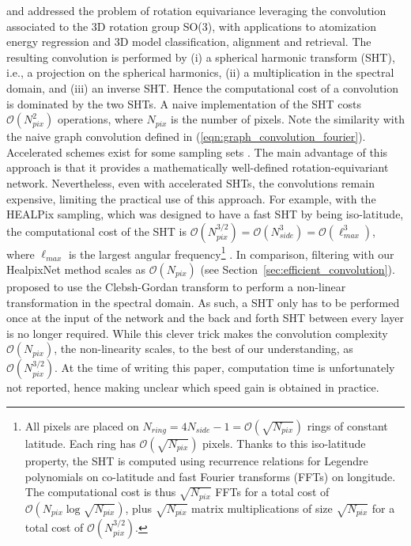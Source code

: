 \documentclass[final,twocolumn,3p,times,authoryear]{elsarticle}
\newcommand{\secref}[1]{Section~\ref{sec:#1}}
\newcommand{\eqnref}[1]{(\ref{eqn:#1})}
\newcommand{\1}{\b{1}}              %
\newcommand{\0}{\b{0}}              %
\newcommand{\bO}{\mathcal{O}}
\begin{document}

\citet{cohen2018sphericalcnn} and \citet{esteves2017sphericalcnn} addressed the problem of rotation equivariance leveraging the convolution associated to the 3D rotation group SO(3), with applications to atomization energy regression and 3D model classification, alignment and retrieval.
The resulting convolution is performed by (i) a spherical harmonic transform (SHT), i.e., a projection on the spherical harmonics, (ii) a  multiplication in the spectral domain, and (iii) an inverse SHT. Hence the computational cost of a convolution is dominated by the two SHTs.
A naive implementation of the SHT costs $\bO(N_{pix}^2)$ operations, where $N_{pix}$ is the number of pixels. Note the similarity with the naive graph convolution defined in \eqnref{graph_convolution_fourier}.
Accelerated schemes exist for some sampling sets \citep[see][for examples]{mohlenkamp1999fast, rokhlin2006fast, reinecke2013libsharp}.
The main advantage of this approach is that it provides a mathematically well-defined rotation-equivariant network. Nevertheless, even with accelerated SHTs, the convolutions remain expensive, limiting the practical use of this approach.
For example, with the HEALPix sampling, which was designed to have a fast SHT by being iso-latitude, the computational cost of the SHT is $\bO(N_{pix}^{3/2}) = \bO(N_{side}^3) = \bO(\ell_{max}^3)$, where $\ell_{max}$ is the largest angular frequency\footnote{All pixels are placed on $N_{ring} = 4N_{side}-1 = \bO\left(\sqrt{N_{pix}}\right)$ rings of constant latitude. Each ring has $\bO\left(\sqrt{N_{pix}}\right)$ pixels. Thanks to this iso-latitude property, the SHT is computed using recurrence relations for Legendre polynomials on co-latitude and fast Fourier transforms (FFTs) on longitude. The computational cost is thus $\sqrt{N_{pix}}$ FFTs for a total cost of $\bO\left( N_{pix} \log \sqrt{N_{pix}} \right)$, plus $\sqrt{N_{pix}}$ matrix multiplications of size $\sqrt{N_{pix}}$ for a total cost of $\bO\left(N_{pix}^{3/2}\right)$.}
\citep{gorski2005healpix, reinecke2013libsharp}.
In comparison, filtering with our HealpixNet method scales as $\bO(N_{pix})$ (see \secref{efficient_convolution}).
\citet{kondor2018clebsch} proposed to use the Clebsh-Gordan transform to perform a non-linear transformation in the spectral domain. As such, a SHT only has to be performed once at the input of the network and the back and forth SHT between every layer is no longer required. While this clever trick makes the convolution complexity $\bO(N_{pix})$, the non-linearity scales, to the best of our understanding, as  $\bO(N_{pix}^{3/2})$. At the time of writing this paper, computation time is unfortunately not reported, hence making unclear which speed gain is obtained in practice. 
\end{document}
